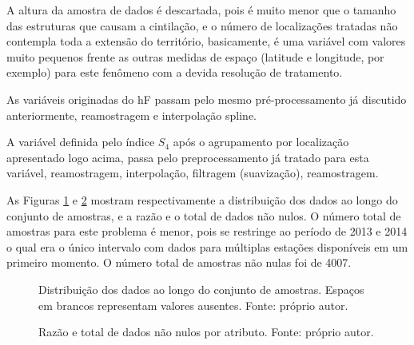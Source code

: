 A altura da amostra de dados é descartada, pois é muito menor que o tamanho das estruturas que causam a cintilação, e o número de localizações tratadas não contempla toda a extensão do território, basicamente, é uma variável com valores muito pequenos frente as outras medidas de espaço (latitude e longitude, por exemplo) para este fenômeno com a devida resolução de tratamento. 

As variáveis originadas do hF passam pelo mesmo pré-processamento já discutido anteriormente, reamostragem e interpolação spline. 

A variável definida pelo índice $S_4$ após o agrupamento por localização apresentado logo acima, passa pelo preprocessamento já tratado para esta variável, reamostragem, interpolação, filtragem (suavização), reamostragem.

As Figuras \ref{fig:distributionall} e \ref{fig:nulltotalall} mostram respectivamente a distribuição dos dados ao longo do conjunto de amostras, e a razão e o total de dados não nulos. O número total de amostras para este problema é menor, pois se restringe ao período de 2013 e 2014 o qual era o único intervalo com dados para múltiplas estações disponíveis em um primeiro momento. O número total de amostras não nulas foi de 4007.

\begin{figure}[H]
\centering
{}
\caption{Distribuição dos dados ao longo do conjunto de amostras. Espaços em brancos representam valores ausentes. Fonte: próprio autor.}
\label{fig:distributionall}
\end{figure}

\begin{figure}[H]
\centering
{}
\caption{Razão e total de dados não nulos por atributo. Fonte: próprio autor.}
\label{fig:nulltotalall}
\end{figure}

